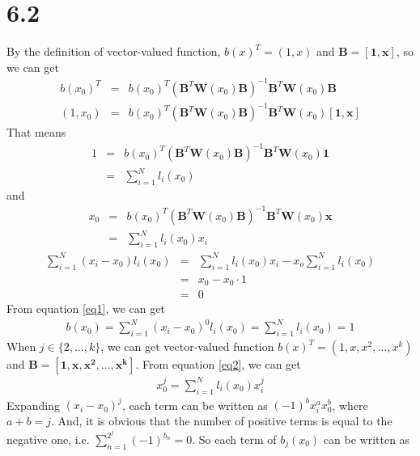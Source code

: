 \documentclass[11pt, oneside]{article}   	%
\begin{document}
\section{6.2}
By the definition of vector-valued function, $b(x)^T = (1, x)$ and $\mathbf{B} = [\mathbf{1}, \mathbf{x}]$, so we can get
\begin{eqnarray}
b(x_0)^T &=& b(x_0)^T (\mathbf{B}^T \mathbf{W}(x_0) \mathbf{B})^{-1} \mathbf{B}^T \mathbf{W}(x_0) \mathbf{B}\\
(1, x_0) &=& b(x_0)^T (\mathbf{B}^T \mathbf{W}(x_0) \mathbf{B})^{-1} \mathbf{B}^T \mathbf{W}(x_0) [\mathbf{1}, \mathbf{x}]
\end{eqnarray}
That means
\begin{eqnarray}
1 &=& b(x_0)^T (\mathbf{B}^T \mathbf{W}(x_0) \mathbf{B})^{-1} \mathbf{B}^T \mathbf{W}(x_0) \mathbf{1} \nonumber \\
&=& \sum_{i = 1}^N l_i(x_0) \label{eq1} 
\end{eqnarray}
and
\begin{eqnarray}
x_0 &=& b(x_0)^T (\mathbf{B}^T \mathbf{W}(x_0) \mathbf{B})^{-1} \mathbf{B}^T \mathbf{W}(x_0) \mathbf{x} \nonumber \\
&=& \sum_{i = 1}^N l_i(x_0)x_i  \label{eq2} 
\end{eqnarray}
\begin{eqnarray}
\sum_{i = 1}^N (x_i - x_0) l_i(x_0) &=& \sum_{i = 1}^N l_i(x_0)x_i - x_o \sum_{i = 1}^N l_i(x_0) \nonumber \\
&=& x_0 - x_0 \cdot 1\\
&=& 0
\end{eqnarray}
From equation \ref{eq1}, we can get
\begin{eqnarray}
b(x_0) = \sum_{i = 1}^N (x_i - x_0)^0 l_i(x_0) = \sum_{i = 1}^N l_i(x_0) = 1
\end{eqnarray}
When $j \in \{2,...,k\}$, we can get vector-valued function $b(x)^T = (1,x,x^2,...,x^k)$ and $ \mathbf{B} = [ \mathbf{1}, \mathbf{x}, \mathbf{x^2},..., \mathbf{x^k}]$. 
From equation \ref{eq2}, we can get
\begin{eqnarray}
x_0^j = \sum_{i = 1}^N l_i(x_0) x_i^j
\end{eqnarray}
Expanding $(x_i - x_0)^j$, each term can be written as $(-1)^b x_i^a x_0^b$, where $a + b = j$. And, it is obvious that the number of positive terms is equal to the negative one, i.e. $\sum_{n=1}^{2^j} (-1)^{b_n} = 0$. So each term of $b_j(x_0)$ can be written as
\end{document}
